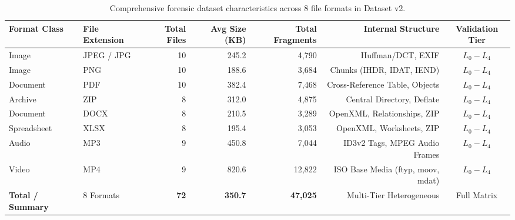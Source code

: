 \begin{table}[t]
\centering
\caption{Comprehensive forensic dataset characteristics across 8 file formats in Dataset v2.}
\label{tab:dataset_characteristics}
\begin{tabular}{llrrrrc}
\toprule
\textbf{Format Class} & \textbf{File Extension} & \textbf{Total Files} & \textbf{Avg Size (KB)} & \textbf{Total Fragments} & \textbf{Internal Structure} & \textbf{Validation Tier} \\
\midrule
Image & JPEG / JPG & 10 & 245.2 & 4,790 & Huffman/DCT, EXIF & $L_0 - L_4$ \\
Image & PNG & 10 & 188.6 & 3,684 & Chunks (IHDR, IDAT, IEND) & $L_0 - L_4$ \\
Document & PDF & 10 & 382.4 & 7,468 & Cross-Reference Table, Objects & $L_0 - L_4$ \\
Archive & ZIP & 8 & 312.0 & 4,875 & Central Directory, Deflate & $L_0 - L_4$ \\
Document & DOCX & 8 & 210.5 & 3,289 & OpenXML, Relationships, ZIP & $L_0 - L_4$ \\
Spreadsheet & XLSX & 8 & 195.4 & 3,053 & OpenXML, Worksheets, ZIP & $L_0 - L_4$ \\
Audio & MP3 & 9 & 450.8 & 7,044 & ID3v2 Tags, MPEG Audio Frames & $L_0 - L_4$ \\
Video & MP4 & 9 & 820.6 & 12,822 & ISO Base Media (ftyp, moov, mdat) & $L_0 - L_4$ \\
\midrule
\textbf{Total / Summary} & 8 Formats & \textbf{72} & \textbf{350.7} & \textbf{47,025} & Multi-Tier Heterogeneous & Full Matrix \\
\bottomrule
\end{tabular}
\end{table}

